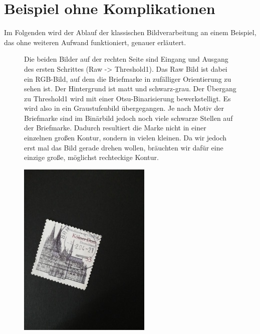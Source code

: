 \documentclass[12pt,toc=bib,toc=listof]{scrreprt}
\begin{document}
\section{Beispiel ohne Komplikationen}
\label{sec_bv:paradebsp}

Im Folgenden wird der Ablauf der klassischen Bildverarbeitung an einem Beispiel, das ohne weiteren Aufwand funktioniert, genauer erläutert.
\begin{figure}

\begin{minipage}[t]{.75\linewidth}
Die beiden Bilder auf der rechten Seite sind Eingang und Ausgang des ersten Schrittes (Raw -> Threshold1). Das Raw Bild ist dabei ein RGB-Bild, auf dem die Briefmarke in zufälliger Orientierung zu sehen ist. Der Hintergrund ist matt und schwarz-grau. Der Übergang zu Threshold1 wird mit einer Otsu-Binarisierung bewerkstelligt. Es wird also in ein Graustufenbild übergegangen. Je nach Motiv der Briefmarke sind im Binärbild jedoch noch viele schwarze Stellen auf der Briefmarke. Dadurch resultiert die Marke nicht in einer einzelnen großen Kontur, sondern in vielen kleinen. Da wir jedoch erst mal das Bild gerade drehen wollen, bräuchten wir dafür eine einzige große, möglichst rechteckige Kontur.
\end{minipage}
\hfill
\begin{minipage}[t]{.2\linewidth}
  \strut\vspace*{-\baselineskip}\newline\includegraphics[width=\linewidth]{./../bilder/start_dom}

\end{minipage}
\end{figure}
\end{document}
